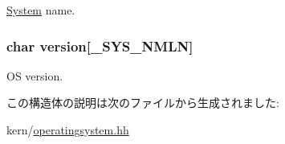 \hyperlink{classSystem}{System} name. \hypertarget{structOperatingSystem_1_1utsname_a1e88526d3e96aa25d88df1541dafe922}{
\subsubsection[{version}]{\setlength{\rightskip}{0pt plus 5cm}char {\bf version}\mbox{[}{\bf \_\-SYS\_\-NMLN}\mbox{]}}}
\label{structOperatingSystem_1_1utsname_a1e88526d3e96aa25d88df1541dafe922}


OS version. 

この構造体の説明は次のファイルから生成されました:\begin{DoxyCompactItemize}
\item 
kern/\hyperlink{operatingsystem_8hh}{operatingsystem.hh}\end{DoxyCompactItemize}
